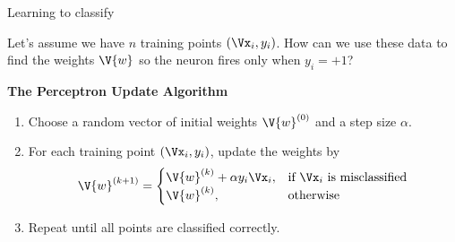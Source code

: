 \documentclass[9pt]{beamer}
\begin{document}
\begin{frame}{Learning to classify}

Let's assume we have $n$ training points $(\Vx_i,y_i)$. How can we use these data to find the weights $\V{w}$ so the neuron fires only when $y_i=+1$?

\bigskip
\pause
\textbf{The Perceptron Update Algorithm}
\begin{enumerate}
	\item Choose a random vector of initial weights $\V{w}^{(0)}$ and a step size $\alpha$.
	\item For each training point $(\Vx_i,y_i)$, update the weights by
	\[ \V{w}^{(k+1)} = \begin{cases} \V{w}^{(k)} + \alpha y_i\Vx_i, & \text{if $\Vx_i$ is misclassified} \\ \V{w}^{(k)}, & \text{otherwise} \end{cases} \]
	\item Repeat until all points are classified correctly.
\end{enumerate}
	
\end{frame}
\end{document}
